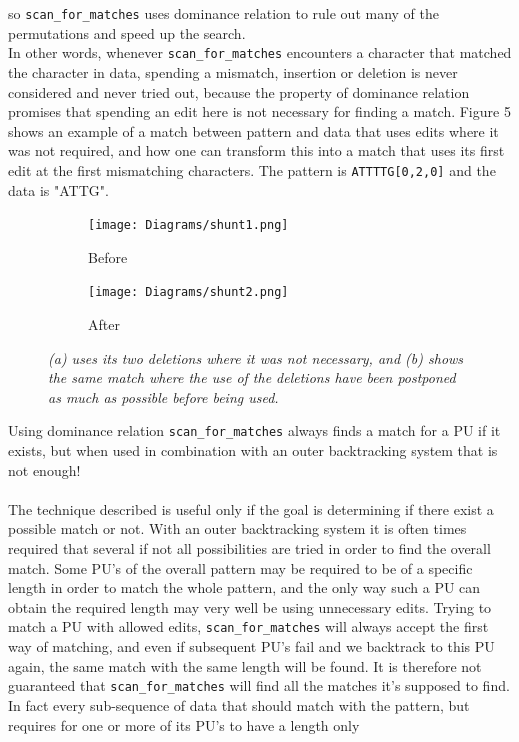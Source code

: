 \documentclass[12pt]{article}
\newcommand{\scm}{\texttt{scan\_for\_matches} }
\newcommand{\pu}{PU }
\newcommand{\pus}{PU's }
\begin{document}
so \scm uses dominance relation to rule out many of the permutations and speed up the search. \\
In other words, whenever \scm
encounters a character that matched the character in data, spending a mismatch, insertion or deletion is never
considered and never tried out, because the property of dominance relation promises that spending an edit
here is not necessary for finding a match. 
Figure 5 shows an example of a match between pattern and data that uses edits where it was not required,
and how one can transform this into a match that uses its first edit at the first mismatching characters.
The pattern is \texttt{ATTTTG[0,2,0]} and the data is "ATTG".
\begin{figure}[H]
\centering
\begin{subfigure}[b]{0.30 \textwidth}
\texttt{[image: Diagrams/shunt1.png]}
\caption{Before}
\end{subfigure}
\hspace{12mm}
\begin{subfigure}[b]{0.3 \textwidth}
\texttt{[image: Diagrams/shunt2.png]}
\caption{After}
\end{subfigure}
\caption{\textit{(a) uses its two deletions where it was not necessary, and (b) shows
the same match where the use of the deletions have been postponed as much as possible before being used.}}
\end{figure}
\noindent Using dominance relation \scm always finds a match for a \pu if it exists, but when used in combination
with an outer backtracking system that is not enough! \\ \\
The technique described is useful only if the goal is determining if there exist a possible match or not.
With an outer backtracking system it is often times required that several if not all possibilities are tried in
order to find the overall match. Some \pus of the overall pattern may be required to be of a specific length in order to
match the whole pattern, and the only way such a \pu can obtain the required length may very well be using unnecessary
edits. Trying to match a \pu with allowed edits, \scm will always accept the first way of matching, and even if
subsequent \pus fail and we backtrack to this \pu again, the same match with the same length will be found. 
It is therefore not guaranteed that \scm will find all the matches it's supposed to find. In fact every sub-sequence
of data that should match with the pattern, but requires for one or more of its \pus to have a length only
\end{document}
